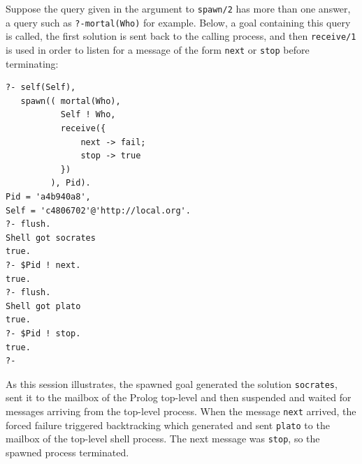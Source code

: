 \documentclass{tlp}
\begin{document}
%
%

\noindent Suppose the query given in the argument to \texttt{spawn/2} has more than one answer, a query such as \texttt{?-mortal(Who)} for example. Below, a goal containing this query is called, the first solution is sent back to the calling process, and then \texttt{receive/1} is used in order to listen for a message of the form \texttt{next} or \texttt{stop} before terminating:

\begin{lstlisting}
?- self(Self),
   spawn(( mortal(Who),
           Self ! Who,
           receive({
               next -> fail;
               stop -> true
           })
         ), Pid).
Pid = 'a4b940a8',
Self = 'c4806702'@'http://local.org'.
?- flush.
Shell got socrates
true.
?- $Pid ! next.
true.
?- flush.
Shell got plato
true.
?- $Pid ! stop.
true.
?-
\end{lstlisting}

\noindent As this session illustrates, the spawned goal generated the solution \texttt{socrates}, sent it to the mailbox of the Prolog top-level and then suspended and waited for messages arriving from the top-level process. When the message \texttt{next} arrived, the forced failure triggered backtracking which generated and sent \texttt{plato} to the mailbox of the top-level shell process. The next message was \texttt{stop}, so the spawned process terminated.
\end{document}
